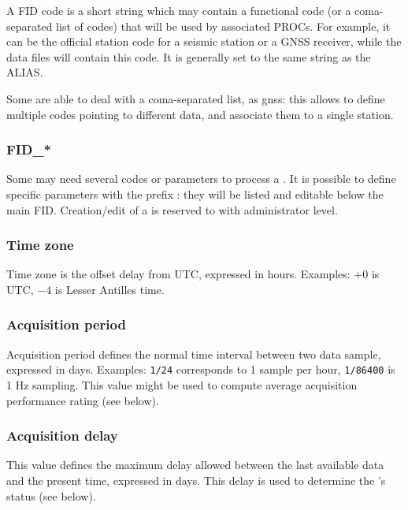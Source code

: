 A FID code is a short string which may contain a functional code (or a coma-separated list of codes) that will be used by associated PROCs. For example, it can be the official station code for a seismic station or a GNSS receiver, while the data files will contain this code. It is generally set to the same string as the ALIAS.

Some  are able to deal with a coma-separated list, as gnss: this allows to define multiple codes pointing to different data, and associate them to a single station.

\subsubsection{FID\_*}

Some  may need several codes or parameters to process a . It is possible to define specific parameters with the prefix : they will be listed and editable below the main FID. Creation/edit of a  is reserved to  with administrator level.


\subsubsection{Time zone}

Time zone is the offset delay from UTC, expressed in hours. Examples: $+0$ is UTC, $-4$ is Lesser Antilles time.

\subsubsection{Acquisition period}

Acquisition period defines the normal time interval between two data sample, expressed in days. Examples: \texttt{1/24} corresponds to 1 sample per hour, \texttt{1/86400} is 1 Hz sampling. This value might be used to compute average acquisition performance rating (see below).

\subsubsection{Acquisition delay}

This value defines the maximum delay allowed between the last available data and the present time, expressed in days. This delay is used to determine the 's status (see below).

